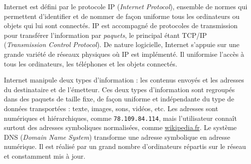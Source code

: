 



\begin{tcolorbox}[title={Protocole TCP/IP}, toprule=0pt, leftrule=0pt, rightrule=0pt, arc=0pt,
                  fonttitle=\scshape\boxtitlefont,
                  colbacktitle=white, coltitle=firstcolor, colframe=firstcolor, colback=firstcolor!10,
                  breakable, enhanced jigsaw]
Internet est défini par le protocole IP (\textit{Internet Protocol}), ensemble de normes qui permettent d’identifier et de nommer de façon uniforme tous les ordinateurs ou objets qui lui sont connectés. IP est accompagné de protocoles de transmission pour transférer l’information par \emph{paquets}, le principal étant TCP/IP (\textit{Transmission Control Protocol}). De nature logicielle, Internet s’appuie sur une grande variété de réseaux physiques où IP est implémenté. Il uniformise l’accès à tous les ordinateurs, les téléphones et les objets connectés.
\end{tcolorbox}

\begin{tcolorbox}[title={Données et information}, toprule=0pt, leftrule=0pt, rightrule=0pt, arc=0pt,
                  fonttitle=\scshape\boxtitlefont,
                  colbacktitle=white, coltitle=firstcolor, colframe=firstcolor, colback=firstcolor!10,
                  breakable, enhanced jigsaw]
Internet manipule deux types d’information : les contenus envoyés et les adresses du destinataire et de l’émetteur. Ces deux types d’information sont regroupés dans des paquets de taille fixe, de façon uniforme et indépendante du type de données transportées : texte, images, sons, vidéos, etc. Les adresses sont numériques et hiérarchiques, comme \texttt{78.109.84.114}, mais l’utilisateur connaît surtout des adresses symboliques normalisées, comme \url{wikipedia.fr}. Le système DNS (\textit{Domain Name System}) transforme une adresse symbolique en adresse numérique. Il est réalisé par un grand nombre d’ordinateurs répartis sur le réseau et constamment mis à jour.
\end{tcolorbox}

